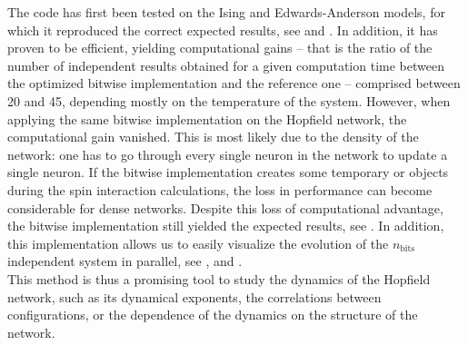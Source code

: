 The code has first been tested on the Ising and Edwards-Anderson models, for which it reproduced the correct expected results, see  and . In addition, it has proven to be efficient, yielding computational gains -- that is the ratio of the number of independent results obtained for a given computation time between the optimized bitwise implementation and the reference one -- comprised between 20 and 45, depending mostly on the temperature of the system. However, when applying the same bitwise implementation on the Hopfield network, the computational gain vanished. This is most likely due to the density of the network: one has to go through every single neuron in the network to update a single neuron. If the bitwise implementation creates some temporary \Bits or \UnsignedInt objects during the spin interaction calculations, the loss in performance can become considerable for dense networks. Despite this loss of computational advantage, the bitwise implementation still yielded the expected results, see . In addition, this implementation allows us to easily visualize the evolution of the $n_\text{bits}$ independent system in parallel, see ,  and .\\
This method is thus a promising tool to study the dynamics of the Hopfield network, such as its dynamical exponents, the correlations between configurations, or the dependence of the dynamics on the structure of the network.
